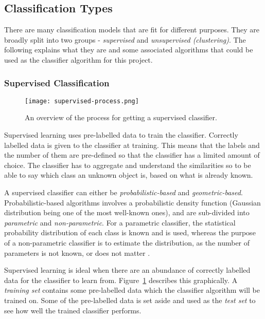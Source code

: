 \subsection{Classification Types}
There are many classification models that are fit for different purposes. They are broadly split into two groups - \textit{supervised} and \textit{unsupervised (clustering)}. The following explains what they are and some associated algorithms that could be used as the classifier algorithm for this project.

\subsubsection{Supervised Classification}

\begin{figure}[h]
  \centering\texttt{[image: supervised-process.png]}
  \caption{An overview of the process for getting a supervised classifier. \protect\cite{class-analysis} }
  \label{fig:supervised-process}
\end{figure}
Supervised learning uses pre-labelled data to train the classifier. Correctly labelled data is given to the classifier at training. This means that the labels and the number of them are pre-defined so that the classifier has a limited amount of choice. The classifier has to aggregate and understand the similarities so to be able to say which class an unknown object is, based on what is already known.~\cite{class-analysis} 

A supervised classifier can either be \textit{probabilistic-based} and \textit{geometric-based}. Probabilistic-based algorithms involves a probabilistic density function (Gaussian distribution being one of the most well-known ones), and are sub-divided into \textit{parametric} and \textit{non-parametric}. For a parametric classifier, the statistical probability distribution of each class is known and is used, whereas the purpose of a non-parametric classifier is to estimate the distribution, as the number of parameters is not known, or does not matter \cite{class-analysis} \cite{hall-notes}.

Supervised learning is ideal when there are an abundance of correctly labelled data for the classifier to learn from. Figure~\ref{fig:supervised-process} describes this graphically. A \textit{training set} contains some pre-labelled data which the classifier algorithm will be trained on. Some of the pre-labelled data is set aside and used as the \textit{test set} to see how well the trained classifier performs. 

